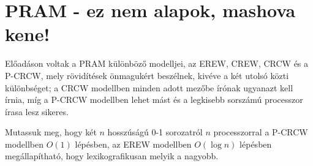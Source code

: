 
\section{PRAM - ez nem alapok, mashova kene!}

 El\H oadáson voltak a PRAM k\"ul\"onb\"oz\H o modelljei, az EREW, CREW, CRCW \'es a P-CRCW, mely r\"ovid\'it\'esek \"onmaguk\'ert besz\'elnek, kiv\'eve a k\'et utols\'o k\"ozti k\"ul\"onbs\'eget; a CRCW modellben minden adott mez\H obe \'ir\'onak ugyanazt kell \'irnia, m\'ig a P-CRCW modellben lehet m\'ast \'es a legkisebb sorsz\'am\'u processzor \'irasa lesz sikeres.



\begin{Exercise}[counter={sorszam}, difficulty=0]
	Mutassuk meg, hogy két $n$ hosszúságú 0-1 sorozatról $n$ processzorral a P-CRCW modellben $O(1)$ lépésben, az EREW modellben $O(\log n)$ lépésben megállapítható, hogy lexikografikusan melyik a nagyobb.
\end{Exercise}	


